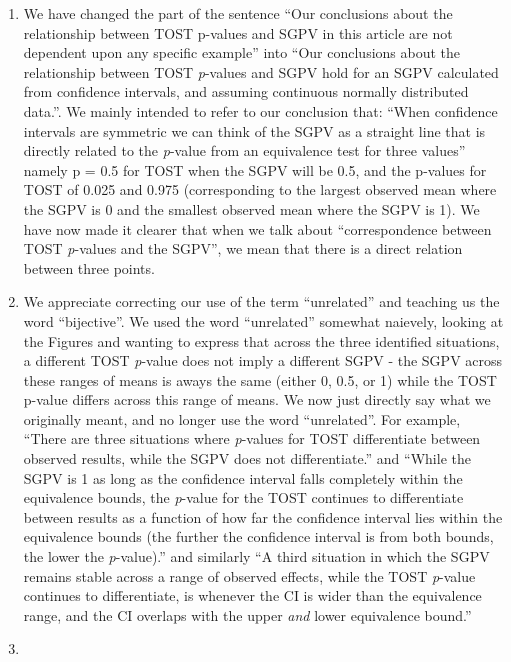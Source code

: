 \documentclass[man]{apa6}
\begin{document}
\begin{enumerate}
\def\labelenumi{\arabic{enumi}.}
\item
  We have changed the part of the sentence \enquote{Our conclusions about the relationship between TOST p-values and SGPV in this article are not dependent upon any specific example} into \enquote{Our conclusions about the relationship between TOST \emph{p}-values and SGPV hold for an SGPV calculated from confidence intervals, and assuming continuous normally distributed data.}. We mainly intended to refer to our conclusion that: \enquote{When confidence intervals are symmetric we can think of the SGPV as a straight line that is directly related to the \emph{p}-value from an equivalence test for three values} namely p = 0.5 for TOST when the SGPV will be 0.5, and the p-values for TOST of 0.025 and 0.975 (corresponding to the largest observed mean where the SGPV is 0 and the smallest observed mean where the SGPV is 1). We have now made it clearer that when we talk about \enquote{correspondence between TOST \emph{p}-values and the SGPV}, we mean that there is a direct relation between three points.
\item
  We appreciate correcting our use of the term \enquote{unrelated} and teaching us the word \enquote{bijective}. We used the word \enquote{unrelated} somewhat naievely, looking at the Figures and wanting to express that across the three identified situations, a different TOST \emph{p}-value does not imply a different SGPV - the SGPV across these ranges of means is aways the same (either 0, 0.5, or 1) while the TOST p-value differs across this range of means. We now just directly say what we originally meant, and no longer use the word \enquote{unrelated}. For example, \enquote{There are three situations where \emph{p}-values for TOST differentiate between observed results, while the SGPV does not differentiate.} and \enquote{While the SGPV is 1 as long as the confidence interval falls completely within the equivalence bounds, the \emph{p}-value for the TOST continues to differentiate between results as a function of how far the confidence interval lies within the equivalence bounds (the further the confidence interval is from both bounds, the lower the \emph{p}-value).} and similarly \enquote{A third situation in which the SGPV remains stable across a range of observed effects, while the TOST \emph{p}-value continues to differentiate, is whenever the CI is wider than the equivalence range, and the CI overlaps with the upper \emph{and} lower equivalence bound.}
\item

\end{enumerate}
\end{document}
